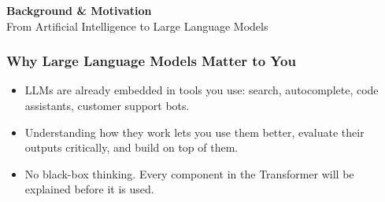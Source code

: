 


\begin{frame}[fragile]\frametitle{}
\begin{center}
{\Large \textbf{Background \& Motivation}}\\[0.5em]
{\normalsize From Artificial Intelligence to Large Language Models}
\end{center}
\end{frame}

\begin{frame}[fragile]\frametitle{Why Large Language Models Matter to You}
\begin{itemize}
  \item LLMs are already embedded in tools you use: search, autocomplete,
    code assistants, customer support bots.
  \item Understanding how they work lets you use them better, evaluate
    their outputs critically, and build on top of them.
  \item No black-box thinking. Every component in the Transformer will be
    explained before it is used.
\end{itemize}
\end{frame}

